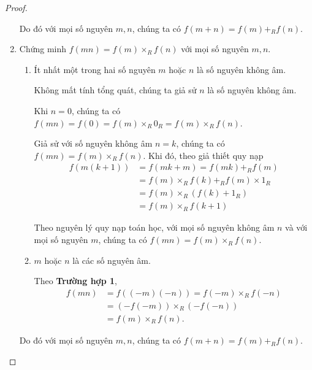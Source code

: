 \begin{proof}
\begin{enumerate}[label={\textbf{Bước \arabic*.}},itemindent=1cm]
              Do đó với mọi số nguyên $m, n$, chúng ta có $f(m + n) = f(m) +_{R} f(n)$.
        \item Chứng minh $f(mn) = f(m) \times_{R} f(n)$ với mọi số nguyên $m, n$.
              \begin{enumerate}[label={\textbf{Trường hợp \arabic*.}},itemindent=1.5cm]
                  \item Ít nhất một trong hai số nguyên $m$ hoặc $n$ là số nguyên không âm.

                        Không mất tính tổng quát, chúng ta giả sử $n$ là số nguyên không âm.

                        Khi $n = 0$, chúng ta có $f(mn) = f(0) = f(m)\times_{R} 0_{R} = f(m) \times_{R} f(n)$.

                        Giả sử với số nguyên không âm $n = k$, chúng ta có $f(mn) = f(m) \times_{R} f(n)$. Khi đó, theo giả thiết quy nạp
                        \begin{align*}
                            f(m(k+1)) & = f(mk + m) = f(mk) +_{R} f(m)               \\
                                      & = f(m)\times_{R} f(k) +_{R} f(m)\times 1_{R} \\
                                      & = f(m)\times_{R} (f(k) + 1_{R})              \\
                                      & = f(m)\times_{R} f(k+1)
                        \end{align*}

                        Theo nguyên lý quy nạp toán học, với mọi số nguyên không âm $n$ và với mọi số nguyên $m$, chúng ta có $f(mn) = f(m)\times_{R} f(n)$.
                  \item $m$ hoặc $n$ là các số nguyên âm.

                        Theo \textbf{Trường hợp 1},
                        \begin{align*}
                            f(mn) & = f((-m)(-n)) = f(-m)\times_{R} f(-n) \\
                                  & = (-f(-m))\times_{R} (-f(-n))         \\
                                  & = f(m) \times_{R} f(n).
                        \end{align*}
              \end{enumerate}

              Do đó với mọi số nguyên $m, n$, chúng ta có $f(m + n) = f(m) +_{R} f(n)$.


\end{enumerate}
\end{proof}
